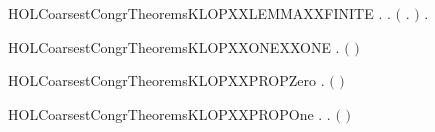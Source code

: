 \begin{SaveVerbatim}{HOLCoarsestCongrTheoremsKLOPXXLEMMAXXFINITE}
\HOLTokenTurnstile{} \HOLSymConst{\HOLTokenForall{}} .
         \HOLSymConst{\HOLTokenConj{}}   \HOLSymConst{\HOLTokenImp{}}
       \HOLSymConst{\HOLTokenExists{}}.
             \HOLSymConst{\HOLTokenConj{}} \ensuremath{(}\HOLSymConst{\HOLTokenForall{}} .  \HOLTokenWeakTransBegin{}\HOLTokenWeakTransEnd {} \HOLSymConst{\HOLTokenImp{}} \HOLSymConst{\HOLTokenNeg{}}  \ensuremath{)} \HOLSymConst{\HOLTokenConj{}}
           \HOLSymConst{\HOLTokenForall{}} .  \HOLTokenWeakTransBegin{}\HOLTokenWeakTransEnd {} \HOLSymConst{\HOLTokenImp{}} \HOLSymConst{\HOLTokenNeg{}}  
\end{SaveVerbatim}
\newcommand{\HOLCoarsestCongrTheoremsKLOPXXLEMMAXXFINITE}{\UseVerbatim{HOLCoarsestCongrTheoremsKLOPXXLEMMAXXFINITE}}
\begin{SaveVerbatim}{HOLCoarsestCongrTheoremsKLOPXXONEXXONE}
\HOLTokenTurnstile{} \HOLSymConst{\HOLTokenForall{}}.  \ensuremath{(} \ensuremath{)}
\end{SaveVerbatim}
\newcommand{\HOLCoarsestCongrTheoremsKLOPXXONEXXONE}{\UseVerbatim{HOLCoarsestCongrTheoremsKLOPXXONEXXONE}}
\begin{SaveVerbatim}{HOLCoarsestCongrTheoremsKLOPXXPROPZero}
\HOLTokenTurnstile{} \HOLSymConst{\HOLTokenForall{}} .  \ensuremath{(}  \ensuremath{)}
\end{SaveVerbatim}
\newcommand{\HOLCoarsestCongrTheoremsKLOPXXPROPZero}{\UseVerbatim{HOLCoarsestCongrTheoremsKLOPXXPROPZero}}
\begin{SaveVerbatim}{HOLCoarsestCongrTheoremsKLOPXXPROPOne}
\HOLTokenTurnstile{} \HOLSymConst{\HOLTokenForall{}}  .    \HOLTokenTransBegin{} \HOLTokenTransEnd {} \HOLSymConst{\HOLTokenEquiv{}} \HOLSymConst{\HOLTokenExists{}}.  \HOLSymConst{\HOLTokenLt{}}  \HOLSymConst{\HOLTokenConj{}} \ensuremath{(} \HOLSymConst{\ensuremath{=}}   \ensuremath{)}
\end{SaveVerbatim}
